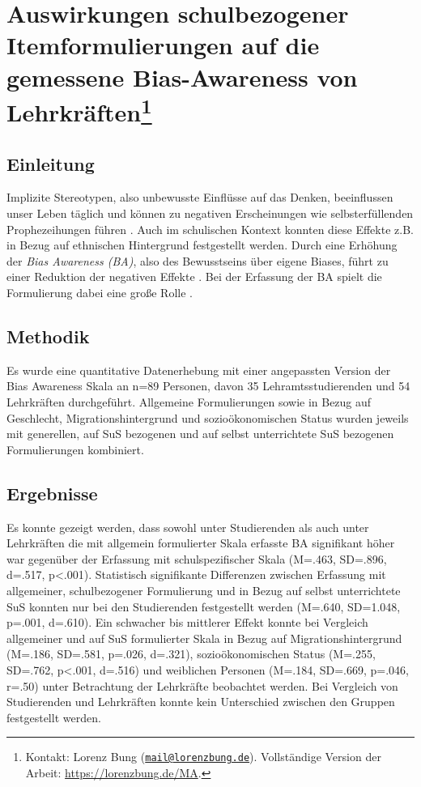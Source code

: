 \documentclass[10pt, a4paper, oneside]{article}
\author{Lorenz Bung}
\makeatletter
\newcommand{\topic}{Auswirkungen schulbezogener Itemformulierungen auf die gemessene Bias-Awareness von Lehrkräften}
\newcommand{\contact}{Kontakt: Lorenz Bung (\href{mailto:mail@lorenzbung.de}{\texttt{mail@lorenzbung.de}}). Vollständige Version der Arbeit: \url{https://lorenzbung.de/MA}.}
\makeatother
\begin{document}
\pagestyle{empty}
\renewcommand{\bibsection}{\subsection*{Literatur}} %
\renewcommand*{\bibfont}{\footnotesize}

\section*{\topic\footnote{\contact}}

\begin{multicols}{2}
	\subsection*{Einleitung}
	Implizite Stereotypen, also unbewusste Einflüsse auf das Denken, beeinflussen unser Leben täglich \cite{macrae2000social} und können zu negativen Erscheinungen wie selbsterfüllenden Prophezeihungen führen \cite{latu2015gender}.
	Auch im schulischen Kontext konnten diese Effekte z.B. in Bezug auf ethnischen Hintergrund \cite{glock2019studies} festgestellt werden.
	Durch eine Erhöhung der \emph{Bias Awareness (BA)}, also des Bewusstseins über eigene Biases, führt zu einer Reduktion der negativen Effekte \cite{perry2015modern}.
	Bei der Erfassung der BA spielt die Formulierung dabei eine große Rolle \cite{bing2004incremental}.
	
	\subsection*{Methodik}
	Es wurde eine quantitative Datenerhebung mit einer angepassten Version der Bias Awareness Skala \cite{perry2015modern} an n=89 Personen, davon 35 Lehramtsstudierenden und 54 Lehrkräften durchgeführt.
	Allgemeine Formulierungen sowie in Bezug auf Geschlecht, Migrationshintergrund und sozioökonomischen Status wurden jeweils mit generellen, auf SuS bezogenen und auf selbst unterrichtete SuS bezogenen Formulierungen kombiniert.
	
	\subsection*{Ergebnisse}
	Es konnte gezeigt werden, dass sowohl unter Studierenden als auch unter Lehrkräften die mit allgemein formulierter Skala erfasste BA signifikant höher war gegenüber der Erfassung mit schulspezifischer Skala (M=.463, SD=.896, d=.517, p<.001).
	Statistisch signifikante Differenzen zwischen Erfassung mit allgemeiner, schulbezogener Formulierung und in Bezug auf selbst unterrichtete SuS konnten nur bei den Studierenden festgestellt werden (M=.640, SD=1.048, p=.001, d=.610).
	Ein schwacher bis mittlerer Effekt konnte bei Vergleich allgemeiner und auf SuS formulierter Skala in Bezug auf Migrationshintergrund (M=.186, SD=.581, p=.026, d=.321), sozioökonomischen Status (M=.255, SD=.762, p<.001, d=.516) und weiblichen Personen (M=.184, SD=.669, p=.046, r=.50) unter Betrachtung der Lehrkräfte beobachtet werden.
	Bei Vergleich von Studierenden und Lehrkräften konnte kein Unterschied zwischen den Gruppen festgestellt werden.
	
	
	
\end{multicols}
\end{document}

